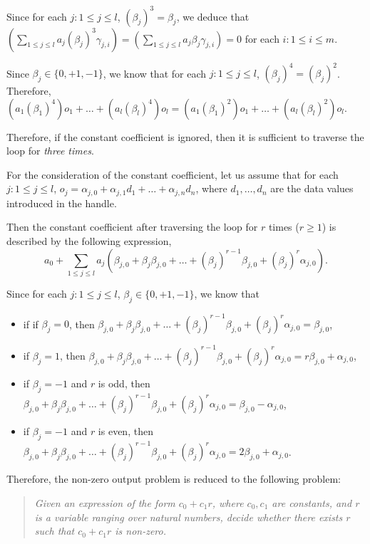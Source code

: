 \documentclass[runningheads,a4paper]{llncs}
\begin{document}
Since for each $j: 1\le j \le l$, $(\beta_j)^3=\beta_j$, we deduce that $(\sum \limits_{1 \le j \le l} a_j (\beta_{j})^3\gamma_{j,i}) = (\sum \limits_{1 \le j \le l} a_j \beta_{j} \gamma_{j,i}) =0$ for each $i: 1\le i \le m$.

Since $\beta_j \in \{0,+1,-1\}$, we know that for each $j: 1\le j \le l$, $(\beta_j)^4=(\beta_j)^2$. Therefore, $(a_1 (\beta_1)^4) o_1 + \dots + (a_l (\beta_l)^4) o_l=(a_1 (\beta_1)^2) o_1 + \dots + (a_l (\beta_l)^2) o_l$.

Therefore, if the constant coefficient is ignored, then it is sufficient to traverse the loop for \emph{three times}.

For the consideration of the constant coefficient, let us assume that for each $j: 1 \le j \le l$, 
$o_j = \alpha_{j,0} + \alpha_{j,1} d_1+ \dots + \alpha_{j,n}d_n$, where $d_1,\dots,d_n$ are the data values introduced in the handle.

Then the constant coefficient after traversing the loop for $r$ times ($r \ge 1$) is described by the following expression,
\[a_0 + \sum \limits_{1 \le j \le l} a_j (\beta_{j,0} + \beta_{j} \beta_{j,0} + \dots + (\beta_j)^{r-1} \beta_{j,0} + (\beta_j)^r \alpha_{j,0}).\]

Since for each $j: 1 \le j \le l$, $\beta_j \in \{0,+1,-1\}$, we know that 
\begin{itemize}
\item if if $\beta_j=0$, then $\beta_{j,0} + \beta_{j} \beta_{j,0} + \dots + (\beta_j)^{r-1} \beta_{j,0} + (\beta_j)^r \alpha_{j,0}=\beta_{j,0}$,
%
\item if $\beta_j=1$, then $\beta_{j,0} + \beta_{j} \beta_{j,0} + \dots + (\beta_j)^{r-1} \beta_{j,0} + (\beta_j)^r \alpha_{j,0}=r\beta_{j,0} + \alpha_{j,0}$,
%
\item if $\beta_j = -1$ and $r$ is odd, then $\beta_{j,0} + \beta_{j} \beta_{j,0} + \dots + (\beta_j)^{r-1} \beta_{j,0} + (\beta_j)^r \alpha_{j,0}= \beta_{j,0} - \alpha_{j,0}$,

\item if $\beta_j = -1$ and $r$ is even, then $\beta_{j,0} + \beta_{j} \beta_{j,0} + \dots + (\beta_j)^{r-1} \beta_{j,0} + (\beta_j)^r \alpha_{j,0}= 2\beta_{j,0} + \alpha_{j,0}$.
\end{itemize}

Therefore, the non-zero output problem is reduced to the following problem: 
\begin{quote}
\it Given an expression of the form $c_0+c_1 r$, where $c_0 ,c_1$ are constants, and $r$ is a variable ranging over natural numbers, decide whether there exists $r$ such that $c_0+ c_1 r$ is non-zero. 
\end{quote}
\end{document}
